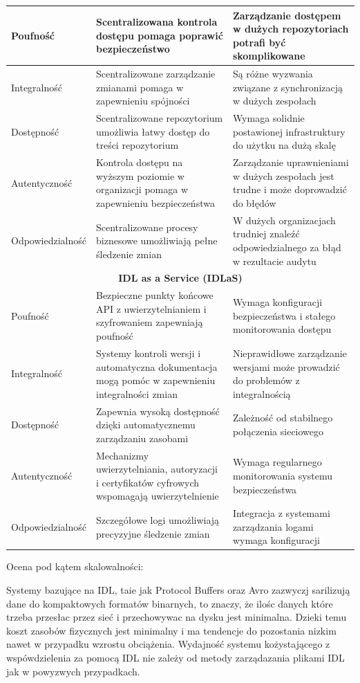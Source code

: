 \documentclass[runningheads,12pt]{llncs}
\begin{document}
\begin{longtable}{|p{4cm}|p{4cm}|p{4cm}|}
    Poufność & Scentralizowana kontrola dostępu pomaga poprawić bezpieczeństwo & Zarządzanie dostępem w dużych repozytoriach potrafi być skomplikowane \\ \hline
    Integralność & Scentralizowane zarządzanie zmianami pomaga w zapewnieniu spójności & Są różne wyzwania związane z synchronizacją w dużych zespołach \\ \hline
    Dostępność & Scentralizowane repozytorium umożliwia łatwy dostęp do treści repozytorium & Wymaga solidnie postawionej infrastruktury do użytku na dużą skalę \\ \hline
    Autentyczność & Kontrola dostępu na wyższym poziomie w organizacji pomaga w zapewnieniu bezpieczeństwa & Zarządzanie uprawnieniami w dużych zespołach jest trudne i może doprowadzić do błędów \\ \hline
    Odpowiedzialność & Scentralizowane procesy biznesowe umożliwiają pełne śledzenie zmian & W dużych organizacjach trudniej znaleźć odpowiedzialnego za błąd w rezultacie audytu \\ \hline
    \multicolumn{3}{|c|}{\textbf{IDL as a Service (IDLaS)}} \\ \hline
    Poufność & Bezpieczne punkty końcowe API z uwierzytelnianiem i szyfrowaniem zapewniają poufność & Wymaga konfiguracji bezpieczeństwa i stałego monitorowania dostępu \\ \hline
    Integralność & Systemy kontroli wersji i automatyczna dokumentacja mogą pomóc w zapewnieniu integralności zmian & Nieprawidłowe zarządzanie wersjami może prowadzić do problemów z integralnością \\ \hline
    Dostępność & Zapewnia wysoką dostępność dzięki automatycznemu zarządzaniu zasobami & Zależność od stabilnego połączenia sieciowego \\ \hline
    Autentyczność & Mechanizmy uwierzytelniania, autoryzacji i certyfikatów cyfrowych wspomagają uwierzytelnienie & Wymaga regularnego monitorowania systemu bezpieczeństwa \\ \hline
    Odpowiedzialność & Szczegółowe logi umożliwiają precyzyjne śledzenie zmian & Integracja z systemami zarządzania logami wymaga konfiguracji \\ \hline
\end{longtable}

Ocena pod kątem skalowalności:

Systemy bazujące na IDL, taie jak Protocol Buffers oraz Avro zazwyczj sarilizują dane do kompaktowych formatów binarnych, to znaczy, że ilośc danych które trzeba przesłac przez sieć i przechowywac na dysku jest minimalna. Dzieki temu koszt zasobów fizycznych jest minimalny i ma tendencje do pozostania nizkim nawet w przypadku wzrostu obciążenia. Wydajność systemu kożystającego z wspówdzielenia za pomocą IDL nie zależy od metody zarządazania plikami IDL jak w powyzwych przypadkach.
\end{document}
